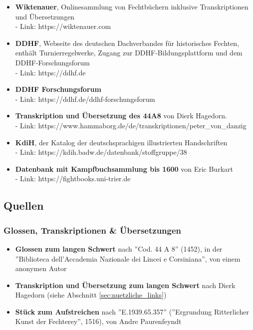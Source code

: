 \begin{itemize}
    \item \textbf{Wiktenauer}, Onlinesammlung von Fechtbüchern inklusive Transkriptionen und Übersetzungen
    \\
    - Link: https://wiktenauer.com
    \item \textbf{DDHF}, Webseite des deutschen Dachverbandes für historisches Fechten, enthält Turnierregelwerke, Zugang zur DDHF-Bildungsplattform und dem DDHF-Forschungsforum
    \\
    - Link: https://ddhf.de
    \item \textbf{DDHF Forschungsforum}
    \\
    - Link: https://ddhf.de/ddhf-forschungsforum
    \item \textbf{Transkription und Übersetzung des 44A8} von Dierk Hagedorn.
    \\
    - Link: https://www.hammaborg.de/de/transkriptionen/peter\_von\_danzig
    \item \textbf{KdiH}, der Katalog der deutschsprachigen illustrierten Handschriften
    \\
    - Link: https://kdih.badw.de/datenbank/stoffgruppe/38
    \item \textbf{Datenbank mit Kampfbuchsammlung bis 1600} von Eric Burkart
    \\
    - Link: https://fightbooks.uni-trier.de
\end{itemize}

\newpage

\subsection{Quellen}

\subsubsection*{Glossen, Transkriptionen \& Übersetzungen}

\begin{itemize}
    \item \textbf{Glossen zum langen Schwert} nach ''Cod. 44 A 8'' (1452), in der ''Biblioteca dell’Accademia Nazionale dei Lincei e Corsiniana'', von einem anonymen Autor
    \item \textbf{Transkription und Übersetzung zum langen Schwert} nach Dierk Hagedorn (siehe Abschnitt \ref{sec:nuetzliche_links})
    \item \textbf{Stück zum Aufstreichen} nach ''E.1939.65.357'' (''Ergrundung Ritterlicher Kunst der Fechterey'', 1516), von Andre Paurenfeyndt
\end{itemize}

